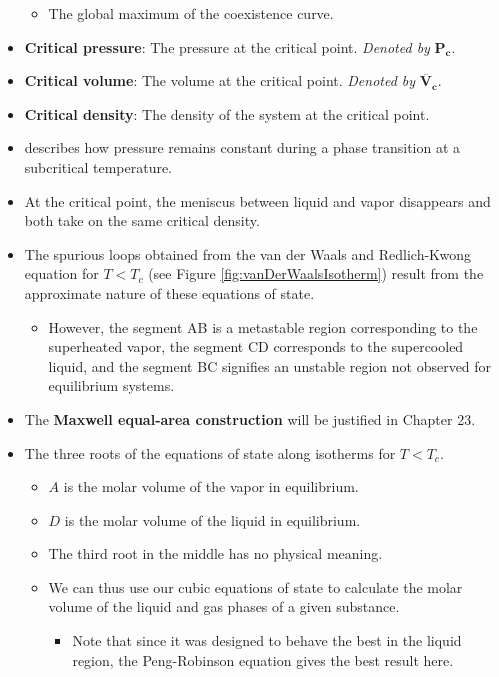 \documentclass[../notes.tex]{subfiles}
\begin{document}
\begin{itemize}
\begin{itemize}
        \item The global maximum of the coexistence curve.
    \end{itemize}
    \item \textbf{Critical pressure}: The pressure at the critical point. \emph{Denoted by} $\bm{P_c}$.
    \item \textbf{Critical volume}: The volume at the critical point. \emph{Denoted by} $\bm{\overline{V}_c}$.
    \item \textbf{Critical density}: The density of the system at the critical point.
    \item \textcite{bib:McQuarrieSimon} describes how pressure remains constant during a phase transition at a subcritical temperature.
    \item At the critical point, the meniscus between liquid and vapor disappears and both take on the same critical density.
    \item The spurious loops obtained from the van der Waals and Redlich-Kwong equation for $T<T_c$ (see Figure \ref{fig:vanDerWaalsIsotherm}) result from the approximate nature of these equations of state.
    \begin{itemize}
        \item However, the segment AB is a metastable region corresponding to the superheated vapor, the segment CD corresponds to the supercooled liquid, and the segment BC signifies an unstable region not observed for equilibrium systems.
    \end{itemize}
    \item The \textbf{Maxwell equal-area construction} will be justified in Chapter 23.
    \item The three roots of the equations of state along isotherms for $T<T_c$.
    \begin{itemize}
        \item $A$ is the molar volume of the vapor in equilibrium.
        \item $D$ is the molar volume of the liquid in equilibrium.
        \item The third root in the middle has no physical meaning.
        \item We can thus use our cubic equations of state to calculate the molar volume of the liquid and gas phases of a given substance.
        \begin{itemize}
            \item Note that since it was designed to behave the best in the liquid region, the Peng-Robinson equation gives the best result here.

\end{itemize}
\end{itemize}
\end{itemize}
\end{document}
